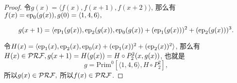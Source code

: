 \begin{proof}
    令$g(x)=\langle f(x),f(x+1),f(x+2)\rangle$, 那么有$f(x)=\mathrm{ep}_0(g(x)),g(0)=\langle 1,4,6\rangle,$

    $$g(x+1)=\langle \mathrm{ep}_1(g(x)), \mathrm{ep}_2(g(x)), \mathrm{ep}_0(g(x))+(\mathrm{ep}_1(g(x)))^2+(\mathrm{ep}_2(g(x)))^3.$$

    令$H(x)=\langle \mathrm{ep}_1(x), \mathrm{ep}_2(x), \mathrm{ep}_0(x)+(\mathrm{ep}_1(x))^2+(\mathrm{ep}_2(x))^2\rangle$, 那么有
    $H(x)\in\mathcal{PRF},g(x+1)=H(g(x))=H\circ P_2^2(x, g(x))$, 也就是$$g=\mathrm{Prim}^0[\langle 1,4,6\rangle, H\circ P_2^2],$$
    所以$g(x)\in\mathcal{PRF},$ 所以$f(x)\in\mathcal{PRF}$.
\end{proof}